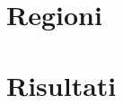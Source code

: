 \documentclass[14pt,usenames,dvipsnames]{beamer}
\begin{document}
%	

\section{Regioni}

\begin{frame}



\end{frame}
\section{Risultati}
\end{document}
